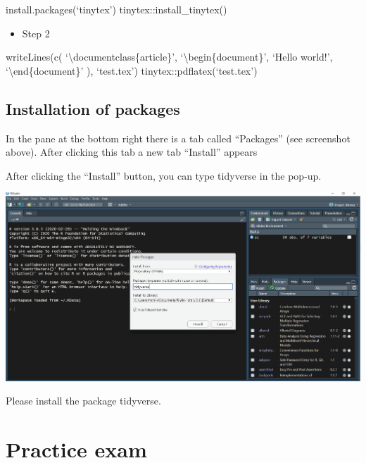 \documentclass[
]{book}
\providecommand{\tightlist}{%
  \setlength{\itemsep}{0pt}\setlength{\parskip}{0pt}}
\begin{document}
install.packages(`tinytex')
tinytex::install\_tinytex()

\begin{itemize}
\tightlist
\item
  Step 2
\end{itemize}

writeLines(c(
`\textbackslash documentclass\{article\}',
`\textbackslash begin\{document\}', `Hello world!', `\textbackslash end\{document\}'
), `test.tex')
tinytex::pdflatex(`test.tex')

\hypertarget{installation-of-packages}{%
\section{Installation of packages}\label{installation-of-packages}}

In the pane at the bottom right there is a tab called ``Packages'' (see screenshot above).
After clicking this tab a new tab ``Install'' appears

After clicking the ``Install'' button, you can type tidyverse in the pop-up.

\includegraphics{install.PNG}

Please install the package tidyverse.

\hypertarget{practice-exam}{%
\chapter{Practice exam}\label{practice-exam}}

  
\end{document}
